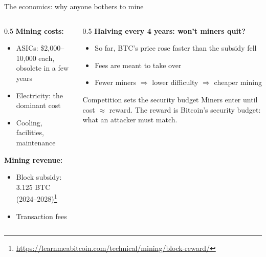 \ifdefined\PRESENTATION\else\PassOptionsToClass{handout}{beamer}\fi\documentclass[aspectratio=169, lualatex]{beamer}
\begin{document}
\begin{frame}{The economics: why anyone bothers to mine}
	\begin{columns}[c]
		\begin{column}{0.5\textwidth}
			\textbf{Mining costs:}
			\begin{itemize}
				\item ASICs: \$2,000--10,000 each, obsolete in a few years
				\item Electricity: the dominant cost
				\item Cooling, facilities, maintenance
			\end{itemize}
			\textbf{Mining revenue:}
			\begin{itemize}
				\item Block subsidy: 3.125 BTC (2024--2028)\footnote{\url{https://learnmeabitcoin.com/technical/mining/block-reward/}}
				\item Transaction fees
			\end{itemize}
		\end{column}
		\begin{column}{0.5\textwidth}
			\textbf{Halving every 4 years: won't miners quit?}
			\begin{itemize}
				\item So far, BTC's price rose faster than the subsidy fell
				\item Fees are meant to take over
				\item Fewer miners $\Rightarrow$ lower difficulty $\Rightarrow$ cheaper mining
			\end{itemize}
			\begin{exampleblock}{Competition sets the security budget}
				Miners enter until cost $\approx$ reward. The reward is Bitcoin's security budget: what an attacker must match.
			\end{exampleblock}
		\end{column}
	\end{columns}
\end{frame}
\end{document}
